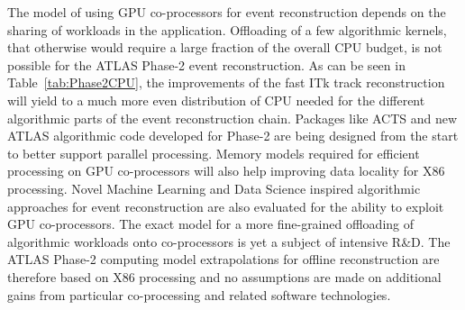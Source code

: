 The model of using GPU co-processors for event reconstruction depends on the sharing of workloads in the application. Offloading of a few algorithmic kernels, that otherwise would require a large fraction of the overall CPU budget, is not possible for the ATLAS Phase-2 event reconstruction. As can be seen in Table~\ref{tab:Phase2CPU}, the improvements of the fast ITk track reconstruction will yield to a much more even distribution of CPU needed for the different algorithmic parts of the event reconstruction chain. Packages like ACTS and new ATLAS algorithmic code developed for Phase-2 are being designed from the start to better support parallel processing. Memory models required for efficient processing on GPU co-processors will also help improving data locality for X86 processing. Novel Machine Learning and Data Science inspired algorithmic approaches for event reconstruction are also evaluated for the ability to exploit GPU co-processors. The exact model for a more fine-grained offloading of algorithmic workloads onto co-processors is yet a subject of intensive R\&D. The ATLAS Phase-2 computing model extrapolations for offline reconstruction are therefore based on X86 processing and no assumptions are made on additional gains from particular co-processing and related software technologies.